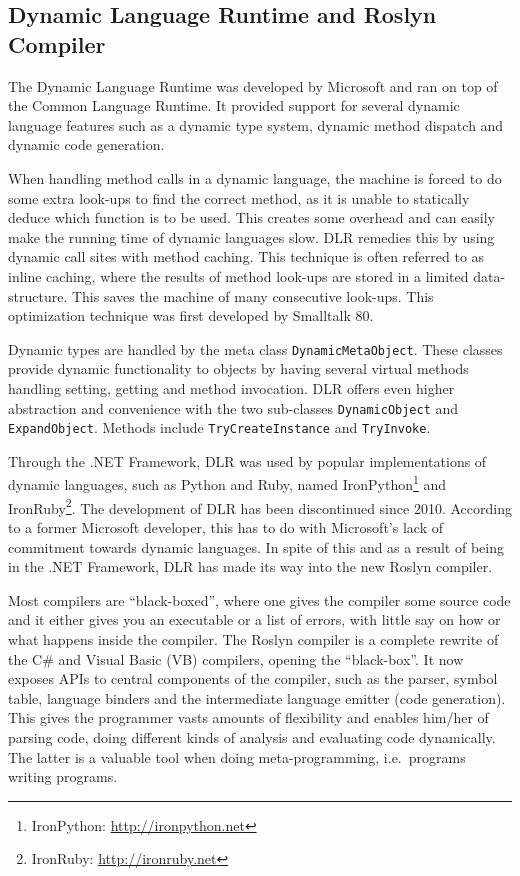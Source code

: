 \subsection{Dynamic Language Runtime and Roslyn Compiler}

The Dynamic Language Runtime\cite{dlr} was developed by Microsoft and ran on
top of the Common Language Runtime. It provided support for several dynamic
language features such as a dynamic type system, dynamic method dispatch and
dynamic code generation.

When handling method calls in a dynamic language, the machine is forced to do
some extra look-ups to find the correct method, as it is unable to statically
deduce which function is to be used. This creates some overhead and can easily
make the running time of dynamic languages slow. DLR remedies this by using
dynamic call sites with method caching. This technique is often referred to as
inline caching, where the results of method look-ups are stored in a limited
data-structure. This saves the machine of many consecutive look-ups. This
optimization technique was first developed by Smalltalk 80\cite{deutsch}.

Dynamic types are handled by the meta class {\tt DynamicMetaObject}. These
classes provide dynamic functionality to objects by having several virtual
methods handling setting, getting and method invocation. DLR offers even higher
abstraction and convenience with the two sub-classes {\tt DynamicObject} and
{\tt ExpandObject}. Methods include {\tt TryCreateInstance} and {\tt TryInvoke}.

Through the .NET Framework, DLR was used by popular implementations of dynamic
languages, such as Python and Ruby, named
IronPython\footnote{IronPython: \url{http://ironpython.net}} and
IronRuby\footnote{IronRuby: \url{http://ironruby.net}}. The development of DLR has been
discontinued since 2010. According to a former Microsoft developer, this has to
do with Microsoft's lack of commitment towards dynamic
languages\cite{schementi}\cite{cooper}. In spite of this and as a result of
being in the .NET Framework, DLR has made its way into the new Roslyn compiler.

Most compilers are ``black-boxed'', where one gives the compiler some source
code and it either gives you an executable or a list of errors, with little say
on how or what happens inside the compiler. The Roslyn compiler is a complete
rewrite of the C\# and Visual Basic (VB) compilers, opening the
``black-box''. It now exposes APIs to central components of the compiler, such
as the parser, symbol table, language binders and the intermediate language
emitter (code generation). This gives the programmer vasts amounts of
flexibility and enables him/her of parsing code, doing different kinds of
analysis and evaluating code dynamically. The latter is a valuable tool when
doing meta-programming, i.e.\ programs writing programs.

